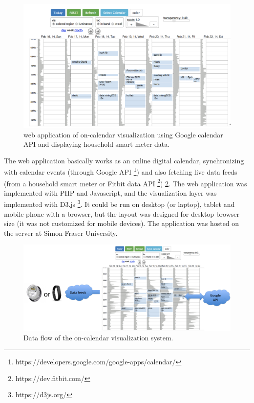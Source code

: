 \documentclass[12pt,oneside]{book}
\begin{document}
\begin{figure}[h]
\centering
\includegraphics[width=\columnwidth]{figures/implementation1}
\caption{web application of on-calendar visualization using Google calendar API and displaying household smart meter data.}
\label{fig:implementation1}
\end{figure}

The web application basically works as an online digital calendar, synchronizing with calendar events (through Google API \footnote{https://developers.google.com/google-apps/calendar/}) and also fetching live data feeds (from a household smart meter or Fitbit data API \footnote{https://dev.fitbit.com/}) \ref{fig:system}. The web application was implemented with PHP and Javascript, and the visualization layer was implemented with D3.js \footnote{https://d3js.org/}. It could be run on desktop (or laptop), tablet and mobile phone with a browser, but the layout was designed for desktop browser size (it was not customized for mobile devices). The application was hosted on the server at Simon Fraser University.

\begin{figure}[h]
\centering
\includegraphics[width=\columnwidth]{figures/system}
\caption{Data flow of the on-calendar visualization system.}
\label{fig:system}
\end{figure}
\end{document}

